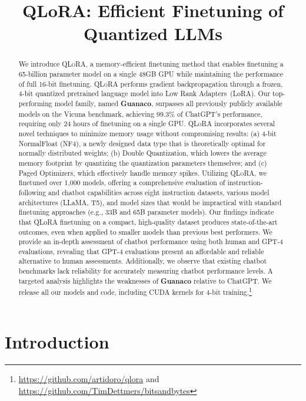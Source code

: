 \title{QLoRA: Efficient Finetuning of Quantized LLMs}

\begin{abstract}
We introduce \textsc{QLoRA}, a memory-efficient finetuning method that enables finetuning a 65-billion parameter model on a single 48GB GPU while maintaining the performance of full 16-bit finetuning. \textsc{QLoRA} performs gradient backpropagation through a frozen, 4-bit quantized pretrained language model into Low Rank Adapters~(LoRA). Our top-performing model family, named \textbf{Guanaco}, surpasses all previously publicly available models on the Vicuna benchmark, achieving 99.3\% of ChatGPT's performance, requiring only 24 hours of finetuning on a single GPU. \textsc{QLoRA} incorporates several novel techniques to minimize memory usage without compromising results: (a) 4-bit NormalFloat (NF4), a newly designed data type that is theoretically optimal for normally distributed weights; (b) Double Quantization, which lowers the average memory footprint by quantizing the quantization parameters themselves; and (c) Paged Optimizers, which effectively handle memory spikes. Utilizing \textsc{QLoRA}, we finetuned over 1,000 models, offering a comprehensive evaluation of instruction-following and chatbot capabilities across eight instruction datasets, various model architectures (LLaMA, T5), and model sizes that would be impractical with standard finetuning approaches (e.g., 33B and 65B parameter models). Our findings indicate that QLoRA finetuning on a compact, high-quality dataset produces state-of-the-art outcomes, even when applied to smaller models than previous best performers. We provide an in-depth assessment of chatbot performance using both human and GPT-4 evaluations, revealing that GPT-4 evaluations present an affordable and reliable alternative to human assessments. Additionally, we observe that existing chatbot benchmarks lack reliability for accurately measuring chatbot performance levels. A targeted analysis highlights the weaknesses of \textbf{Guanaco} relative to ChatGPT. We release all our models and code, including CUDA kernels for 4-bit training.\footnote{\url{https://github.com/artidoro/qlora} and \url{https://github.com/TimDettmers/bitsandbytes}}
\end{abstract}

\section{Introduction}

